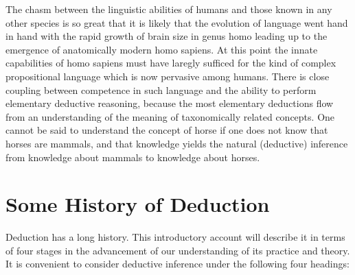\documentclass[10pt,titlepage]{book}
\begin{document}
{The chasm between the linguistic abilities of humans and those known in any other species is so great that it is likely that the evolution of language went hand in hand with the rapid growth of brain size in genus homo leading up to the emergence of anatomically modern homo sapiens.
At this point the innate capabilities of homo sapiens must have laregly sufficed for the kind of complex propositional language which is now pervasive among humans.
There is close coupling between competence in such language and the ability to perform elementary deductive reasoning, because the most elementary deductions flow from an understanding of the meaning of taxonomically related concepts.
One cannot be said to understand the concept of horse if one does not know that horses are mammals, and that knowledge yields the natural (deductive) inference from knowledge about mammals to knowledge about horses.

}

\section{Some History of Deduction}

Deduction has a long history.
This introductory account will describe it in terms of four stages in the advancement of our understanding of its practice and theory.
It is convenient to consider deductive inference under the following four headings:
\end{document}
